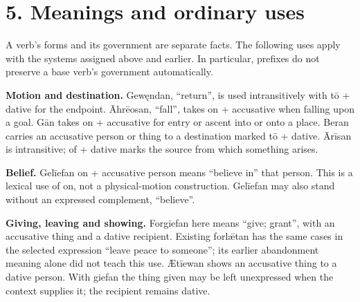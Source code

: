\section*{5. Meanings and ordinary uses}

A verb’s forms and its government are separate facts. The following uses apply with the systems assigned above and earlier. In particular, prefixes do not preserve a base verb’s government automatically.

\textbf{Motion and destination.} Gewęndan, “return”, is used intransitively with tō + dative for the endpoint. Āhrēosan, “fall”, takes on + accusative when falling upon a goal. Gān takes on + accusative for entry or ascent into or onto a place. Beran carries an accusative person or thing to a destination marked tō + dative. Ārīsan is intransitive; of + dative marks the source from which something arises.

\textbf{Belief.} Gelīefan on + accusative person means “believe in” that person. This is a lexical use of on, not a physical-motion construction. Gelīefan may also stand without an expressed complement, “believe”.

\textbf{Giving, leaving and showing.} Forgiefan here means “give; grant”, with an accusative thing and a dative recipient. Existing forlǣtan has the same cases in the selected expression “leave peace to someone”; its earlier abandonment meaning alone did not teach this use. Ætīewan shows an accusative thing to a dative person. With giefan the thing given may be left unexpressed when the context supplies it; the recipient remains dative.

